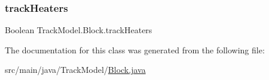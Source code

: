 \subsubsection{\texorpdfstring{track\+Heaters}{trackHeaters}}
{\footnotesize\ttfamily Boolean Track\+Model.\+Block.\+track\+Heaters}



The documentation for this class was generated from the following file\+:\begin{DoxyCompactItemize}
\item 
src/main/java/\+Track\+Model/\hyperlink{Block_8java}{Block.\+java}\end{DoxyCompactItemize}
